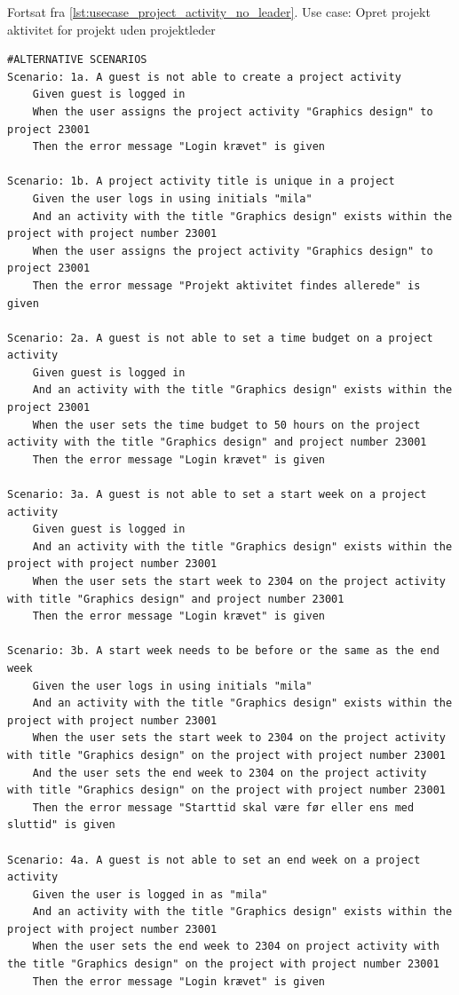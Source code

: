 \begin{listing}[H]
    \centering
    \caption{Fortsat fra \cref{lst:usecase_project_activity_no_leader}. Use case: Opret projekt aktivitet for projekt uden projektleder} \label{lst:usecase_project_activity_no_leader_2}
    \begin{verbatim}
#ALTERNATIVE SCENARIOS
Scenario: 1a. A guest is not able to create a project activity
    Given guest is logged in
    When the user assigns the project activity "Graphics design" to project 23001
    Then the error message "Login krævet" is given

Scenario: 1b. A project activity title is unique in a project
    Given the user logs in using initials "mila"
    And an activity with the title "Graphics design" exists within the project with project number 23001
    When the user assigns the project activity "Graphics design" to project 23001
    Then the error message "Projekt aktivitet findes allerede" is given

Scenario: 2a. A guest is not able to set a time budget on a project activity
    Given guest is logged in
    And an activity with the title "Graphics design" exists within the project 23001
    When the user sets the time budget to 50 hours on the project activity with the title "Graphics design" and project number 23001
    Then the error message "Login krævet" is given

Scenario: 3a. A guest is not able to set a start week on a project activity
    Given guest is logged in
    And an activity with the title "Graphics design" exists within the project with project number 23001
    When the user sets the start week to 2304 on the project activity with title "Graphics design" and project number 23001
    Then the error message "Login krævet" is given

Scenario: 3b. A start week needs to be before or the same as the end week
    Given the user logs in using initials "mila"
    And an activity with the title "Graphics design" exists within the project with project number 23001
    When the user sets the start week to 2304 on the project activity with title "Graphics design" on the project with project number 23001
    And the user sets the end week to 2304 on the project activity with title "Graphics design" on the project with project number 23001
    Then the error message "Starttid skal være før eller ens med sluttid" is given

Scenario: 4a. A guest is not able to set an end week on a project activity
    Given the user is logged in as "mila"
    And an activity with the title "Graphics design" exists within the project with project number 23001
    When the user sets the end week to 2304 on project activity with the title "Graphics design" on the project with project number 23001
    Then the error message "Login krævet" is given


\end{verbatim}
\end{listing}
